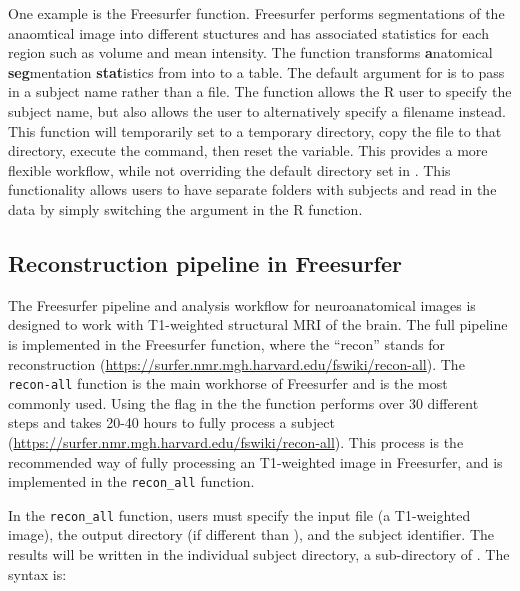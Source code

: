 One example is the  Freesurfer function.
Freesurfer performs segmentations of the anaomtical image into different
stuctures and has associated statistics for each region such as volume
and mean intensity. The  function transforms
\textbf{a}natomical \textbf{seg}mentation \textbf{stat}istics from into
to a table. The default argument for  is to pass
in a subject name rather than a file. The 
 function allows the R user to specify the subject
name, but also allows the user to alternatively specify a filename
instead. This function will temporarily set  to a
temporary directory, copy the file to that directory, execute the
command, then reset the  variable. This provides a
more flexible workflow, while not overriding the default directory set
in . This functionality allows users to have
separate folders with subjects and read in the data by simply switching
the  argument in the R function.

\subsection{Reconstruction pipeline in
Freesurfer}\label{reconstruction-pipeline-in-freesurfer}

The Freesurfer pipeline and analysis workflow for neuroanatomical images
is designed to work with T1-weighted structural MRI of the brain. The
full pipeline is implemented in the Freesurfer 
function, where the ``recon'' stands for reconstruction
(\url{https://surfer.nmr.mgh.harvard.edu/fswiki/recon-all}). The
\texttt{recon-all} function is the main workhorse of Freesurfer and is
the most commonly used. Using the  flag in the the
 function performs over 30 different steps and takes
20-40 hours to fully process a subject
(\url{https://surfer.nmr.mgh.harvard.edu/fswiki/recon-all}). This
process is the recommended way of fully processing an T1-weighted image
in Freesurfer, and is implemented in the \texttt{recon\_all}
 function.

In the \texttt{recon\_all} function, users must specify the input file
(a T1-weighted image), the output directory (if different than
), and the subject identifier. The results will be
written in the individual subject directory, a sub-directory of
. The syntax is:

